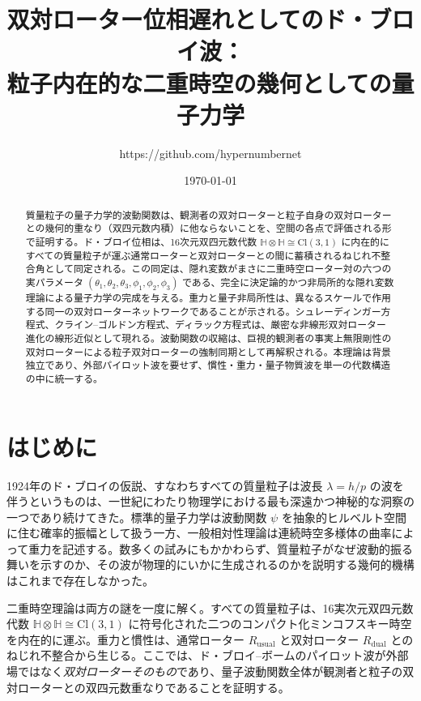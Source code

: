 \documentclass[a4paper]{article}
\title{双対ローター位相遅れとしてのド・ブロイ波：\\粒子内在的な二重時空の幾何としての量子力学}
\author{https://github.com/hypernumbernet}
\date{\today}
\begin{document}
\maketitle

\begin{abstract}
質量粒子の量子力学的波動関数は、観測者の双対ローターと粒子自身の双対ローターとの幾何的重なり（双四元数内積）に他ならないことを、空間の各点で評価される形で証明する。ド・ブロイ位相は、16次元双四元数代数 $\mathbb{H}\otimes\mathbb{H}\cong\mathrm{Cl}(3,1)$ に内在的にすべての質量粒子が運ぶ通常ローターと双対ローターとの間に蓄積されるねじれ不整合角として同定される。この同定は、隠れ変数がまさに二重時空ローター対の六つの実パラメータ $(\theta_1,\theta_2,\theta_3,\phi_1,\phi_2,\phi_3)$ である、完全に決定論的かつ非局所的な隠れ変数理論による量子力学の完成を与える。重力と量子非局所性は、異なるスケールで作用する同一の双対ローターネットワークであることが示される。シュレーディンガー方程式、クライン--ゴルドン方程式、ディラック方程式は、厳密な非線形双対ローター進化の線形近似として現れる。波動関数の収縮は、巨視的観測者の事実上無限剛性の双対ローターによる粒子双対ローターの強制同期として再解釈される。本理論は背景独立であり、外部パイロット波を要せず、慣性・重力・量子物質波を単一の代数構造の中に統一する。
\end{abstract}

\section{はじめに}

1924年のド・ブロイの仮説、すなわちすべての質量粒子は波長 $\lambda = h/p$ の波を伴うというものは、一世紀にわたり物理学における最も深遠かつ神秘的な洞察の一つであり続けてきた。標準的量子力学は波動関数 $\psi$ を抽象的ヒルベルト空間に住む確率的振幅として扱う一方、一般相対性理論は連続時空多様体の曲率によって重力を記述する。数多くの試みにもかかわらず、質量粒子がなぜ波動的振る舞いを示すのか、その波が物理的にいかに生成されるのかを説明する幾何的機構はこれまで存在しなかった。

二重時空理論は両方の謎を一度に解く。すべての質量粒子は、16実次元双四元数代数 $\mathbb{H}\otimes\mathbb{H}\cong\mathrm{Cl}(3,1)$ に符号化された二つのコンパクト化ミンコフスキー時空を内在的に運ぶ。重力と慣性は、通常ローター $R_\text{usual}$ と双対ローター $R_\text{dual}$ とのねじれ不整合から生じる。ここでは、ド・ブロイ--ボームのパイロット波が外部場ではなく\emph{双対ローターそのもの}であり、量子波動関数全体が観測者と粒子の双対ローターとの双四元数重なりであることを証明する。
\end{document}
